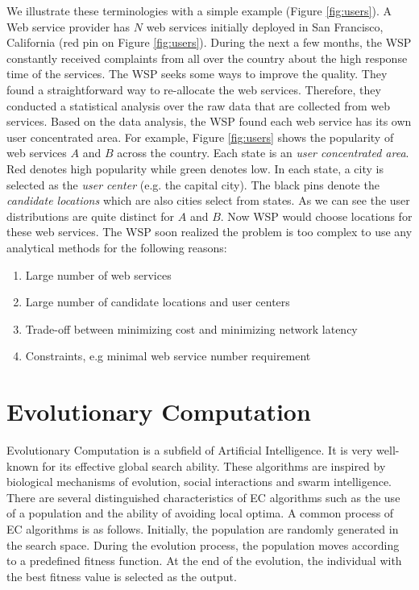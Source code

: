We illustrate these terminologies with a simple example (Figure \ref{fig:users}). 
A Web service provider has $N$ web services initially deployed in San Francisco, California (red pin on Figure \ref{fig:users}). During the next a few months, the WSP constantly received complaints
from all over the country about the high response time of the services. The WSP seeks some ways to improve the quality. They found a straightforward
way to re-allocate the web services. Therefore, they conducted a statistical analysis over the 
raw data that are collected from web services. Based on the data analysis, the WSP found each web service has its own user concentrated area. 
For example, Figure \ref{fig:users} shows the popularity of web services $A$ and $B$ across the country. Each state is an \emph{user concentrated area}.
Red denotes high popularity while green denotes low. In each state, a city is selected as the \emph{user center} (e.g. the capital city).
The black pins denote the \emph{candidate locations} which are also cities select from states. 
As we can see the user distributions are quite distinct for $A$ and $B$. Now WSP would choose locations for these web services.
The WSP soon realized the problem is too complex to use any analytical methods for the following reasons:
\begin{enumerate}
 \item Large number of web services
 \item Large number of candidate locations and user centers
 \item Trade-off between minimizing cost and minimizing network latency
 \item Constraints, e.g minimal web service number requirement
\end{enumerate}




\section{Evolutionary Computation}
Evolutionary Computation is a subfield of Artificial Intelligence. It is very well-known for its effective global search ability. These algorithms are 
inspired by biological mechanisms of evolution, social interactions and swarm intelligence. 
There are several distinguished characteristics of EC algorithms such
as the use of a population and the ability of avoiding local optima. 
A common process of EC algorithms is as follows. Initially, the population are randomly generated in the search space. During the evolution process, the population
moves according to a predefined fitness function. At the end of the evolution, the individual with the best fitness value is selected as the output.

